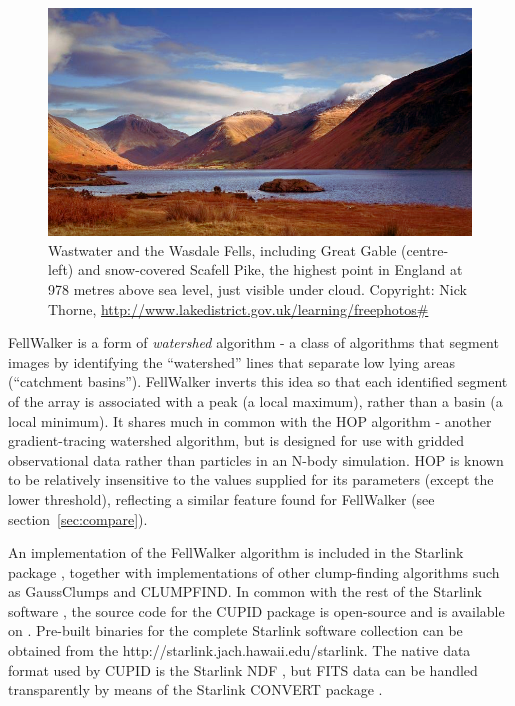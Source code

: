 \documentclass[final,authoryear,5p,times,twocolumn]{elsarticle}
\begin{document}
\begin{figure}
\includegraphics[width=\columnwidth]{wasdale}
\caption{Wastwater and the Wasdale Fells, including Great Gable
(centre-left) and snow-covered Scafell Pike, the highest point in England
at 978 metres above sea level, just visible under cloud. Copyright: Nick
Thorne, \url{http://www.lakedistrict.gov.uk/learning/freephotos\#} }
\label{fig:wasdale}
\end{figure}

FellWalker is a form of \emph{watershed} algorithm \citep{2001Roerdink} -
a class of algorithms that segment images by identifying the
``watershed'' lines that separate low lying areas (``catchment basins'').
FellWalker inverts this idea so that each identified segment of the array
is associated with a peak (a local maximum), rather than a basin (a local
minimum). It shares much in common with the HOP algorithm
\citep{1998Eisenstein} - another gradient-tracing watershed algorithm, but is
designed for use with gridded observational data rather than particles in
an N-body simulation. HOP is known to be relatively insensitive to the
values supplied for its parameters (except the lower threshold),
reflecting a similar feature found for FellWalker (see
section~\ref{sec:compare}).

An implementation of the FellWalker algorithm is included in the Starlink
package \citep[][]{CupidAdass,SUN255}, together with
implementations of other clump-finding algorithms such as GaussClumps
\citep[][]{1990ApJ...356..513S} and CLUMPFIND. In common
with the rest of the Starlink software
\citep[][]{StarlinkAdass}, the source code for the CUPID
package is open-source and is available on
. Pre-built
binaries for the complete Starlink software collection can be obtained
from the 
{http://starlink.jach.hawaii.edu/starlink}. The native data format used
by CUPID is the Starlink NDF \citep{2014Jenness}, but FITS data can be handled
transparently by means of the Starlink CONVERT package \citep{SUN55}.
\end{document}
